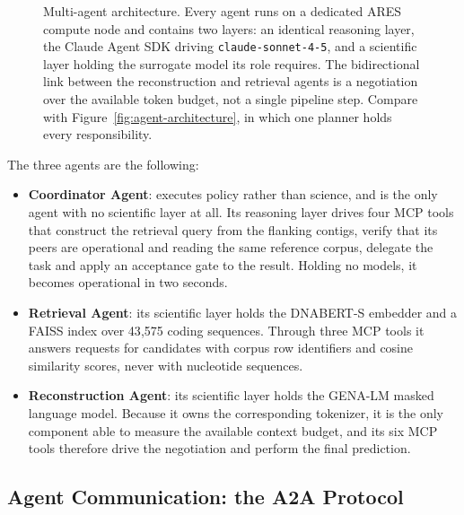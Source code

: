 \begin{figure}[H]
    \caption{Multi-agent architecture. Every agent runs on a dedicated ARES compute node and
    contains two layers: an identical reasoning layer, the Claude Agent SDK driving
    \texttt{claude-sonnet-4-5}, and a scientific layer holding the surrogate model its role
    requires. The bidirectional link between the reconstruction and retrieval agents is a
    negotiation over the available token budget, not a single pipeline step. Compare with
    Figure~\ref{fig:agent-architecture}, in which one planner holds every responsibility.}
    \label{fig:mas-architecture}
\end{figure}

The three agents are the following:

\begin{itemize}
    \item \textbf{Coordinator Agent}: executes policy rather than science, and is the only
    agent with no scientific layer at all. Its reasoning layer drives four MCP tools that
    construct the retrieval query from the flanking contigs, verify that its peers are
    operational and reading the same reference corpus, delegate the task and apply an
    acceptance gate to the result. Holding no models, it becomes operational in two seconds.

    \item \textbf{Retrieval Agent}: its scientific layer holds the DNABERT-S embedder and a
    FAISS index over 43{,}575 coding sequences. Through three MCP tools it answers requests
    for candidates with corpus row identifiers and cosine similarity scores, never with
    nucleotide sequences.

    \item \textbf{Reconstruction Agent}: its scientific layer holds the GENA-LM masked
    language model. Because it owns the corresponding tokenizer, it is the only component
    able to measure the available context budget, and its six MCP tools therefore drive the
    negotiation and perform the final prediction.
\end{itemize}

\subsection{Agent Communication: the A2A Protocol}


